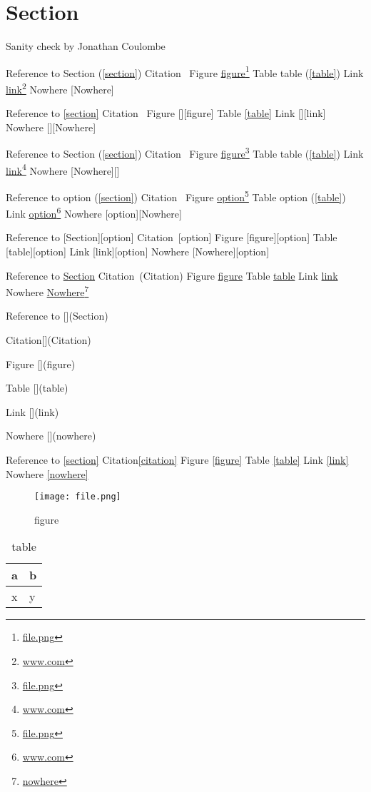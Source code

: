 
\def\mytitle{MultiMarkdown Sanity Test}

\part{Section}
\label{section}

Sanity check by Jonathan Coulombe

Reference to Section (\autoref{section})
Citation~\citep{Citation}
Figure \href{file.png}{figure}\footnote{\href{file.png}{file.png}}
Table table (\autoref{table})
Link \href{www.com}{link}\footnote{\href{www.com}{www.com}}
Nowhere [Nowhere]

Reference to \autoref{section}
Citation~\citep{Citation}
Figure [][figure]
Table \autoref{table}
Link [][link]
Nowhere [][Nowhere]

Reference to Section (\autoref{section})
Citation~\citep{Citation}
Figure \href{file.png}{figure}\footnote{\href{file.png}{file.png}}
Table table (\autoref{table})
Link \href{www.com}{link}\footnote{\href{www.com}{www.com}}
Nowhere [Nowhere][]

Reference to option (\autoref{section})
Citation~\citep[option]{Citation}
Figure \href{file.png}{option}\footnote{\href{file.png}{file.png}}
Table option (\autoref{table})
Link \href{www.com}{option}\footnote{\href{www.com}{www.com}}
Nowhere [option][Nowhere]

Reference to [Section][option]
Citation~\citep{Citation}[option]
Figure [figure][option]
Table [table][option]
Link [link][option]
Nowhere [Nowhere][option]

Reference to \href{Section}{Section}
Citation~\citep{Citation}(Citation)
Figure \href{figure}{figure}
Table \href{table}{table}
Link \href{link}{link}
Nowhere \href{nowhere}{Nowhere}\footnote{\href{nowhere}{nowhere}}

Reference to [](Section)

Citation[](Citation)

Figure [](figure)

Table [](table)

Link [](link)

Nowhere [](nowhere)

Reference to \autoref{section}
Citation\autoref{citation}
Figure \autoref{figure}
Table \autoref{table}
Link \autoref{link}
Nowhere \autoref{nowhere}

\begin{figure}[htbp]
\centering
\texttt{[image: file.png]}
\caption{figure}
\label{figure}
\end{figure}



\begin{table}[htbp]
\begin{minipage}{\linewidth}
\setlength{\tymax}{0.5\linewidth}
\centering
\small
\caption{table}
\label{table}
\begin{tabular}{@{}ll@{}} \toprule
a&b\\
\midrule
x&y\\

\bottomrule

\end{tabular}
\end{minipage}
\end{table}





